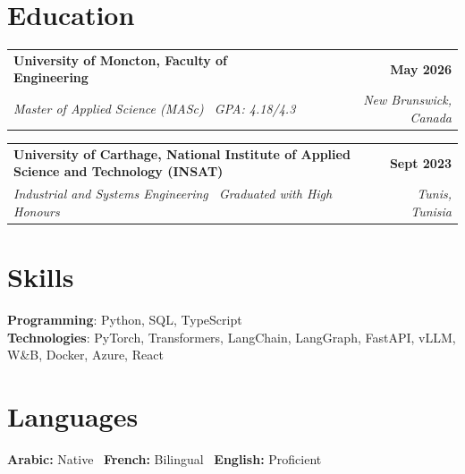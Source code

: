 \documentclass[letterpaper,10pt]{article}
\makeatletter
\newcommand{\resumeSubheading}[4]{
  \par\addvspace{5pt}\noindent
  \begin{tabularx}{\textwidth}{@{}>{\raggedright\arraybackslash}X r@{}}
    \textbf{#1} & \textbf{#2} \\
    \textit{#3} & \textit{#4}
  \end{tabularx}\par\nopagebreak
}
\makeatother
\begin{document}
\section{Education}
\resumeSubheading
{University of Moncton, Faculty of Engineering}
{May 2026}
{Master of Applied Science (MASc) \textbar\ GPA: 4.18/4.3}
{New Brunswick, Canada}
\resumeSubheading
{University of Carthage, National Institute of Applied Science and Technology (INSAT)}
{Sept 2023}
{Industrial and Systems Engineering \textbar\ Graduated with High Honours}
{Tunis, Tunisia}

\section{Skills}
\textbf{Programming}: Python, SQL, TypeScript \\
\textbf{Technologies}: PyTorch, Transformers, LangChain, LangGraph, FastAPI, vLLM, W\&B, Docker, Azure, React

\section{Languages}
\textbf{Arabic:} Native \textbar\ \textbf{French:} Bilingual \textbar\ \textbf{English:} Proficient
\end{document}
